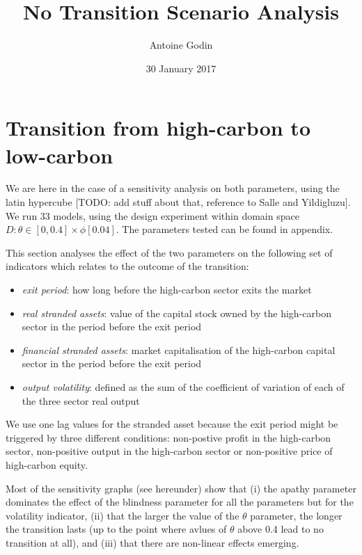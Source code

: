 \documentclass[]{article}
\title{No Transition Scenario Analysis}
\author{Antoine Godin}
\date{30 January 2017}
\providecommand{\tightlist}{%
  \setlength{\itemsep}{0pt}\setlength{\parskip}{0pt}}
\begin{document}
\maketitle

\section{Transition from high-carbon to
low-carbon}\label{transition-from-high-carbon-to-low-carbon}

We are here in the case of a sensitivity analysis on both parameters,
using the latin hypercube {[}TODO: add stuff about that, reference to
Salle and Yildigluzu{]}. We run 33 models, using the design experiment
within domain space \(D:\theta \in [0,0.4] \times \phi [0.04]\). The
parameters tested can be found in appendix.

This section analyses the effect of the two parameters on the following
set of indicators which relates to the outcome of the transition:

\begin{itemize}
\tightlist
\item
  \emph{exit period}: how long before the high-carbon sector exits the
  market
\item
  \emph{real stranded assets}: value of the capital stock owned by the
  high-carbon sector in the period before the exit period
\item
  \emph{financial stranded assets}: market capitalisation of the
  high-carbon capital sector in the period before the exit period
\item
  \emph{output volatility}: defined as the sum of the coefficient of
  variation of each of the three sector real output
\end{itemize}

We use one lag values for the stranded asset because the exit period
might be triggered by three different conditions: non-postive profit in
the high-carbon sector, non-positive output in the high-carbon sector or
non-positive price of high-carbon equity.

Most of the sensitivity graphs (see hereunder) show that (i) the apathy
parameter dominates the effect of the blindness parameter for all the
parameters but for the volatility indicator, (ii) that the larger the
value of the \(\theta\) parameter, the longer the transition lasts (up
to the point where avlues of \(\theta\) above 0.4 lead to no transition
at all), and (iii) that there are non-linear effects emerging.
\end{document}
